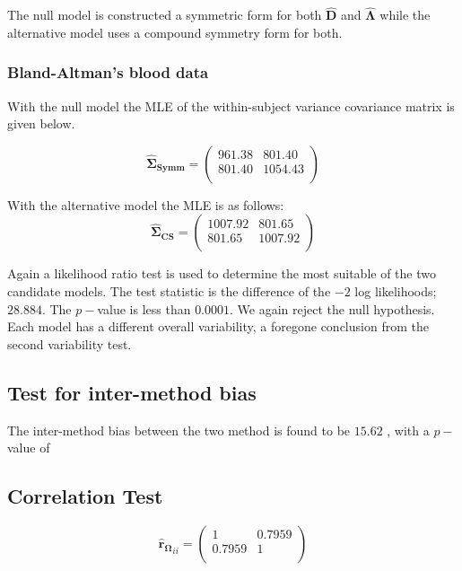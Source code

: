 \documentclass[12pt, a4paper]{report}
\theoremstyle{plain}
\theoremstyle{definition}
\theoremstyle{remark}
\begin{document}
	The null model is constructed a symmetric form for both $\boldsymbol{\hat{D}}$ and $\boldsymbol{\hat{\Lambda}}$ while the alternative model uses a compound symmetry form for both.
	
	\subsubsection{Bland-Altman's blood data}
	With the null model the MLE of the within-subject variance covariance matrix is given below.
	
	\begin{equation}
	\boldsymbol{\hat{\Sigma}_{Symm}} = \left( \begin{array}{cc}
	961.38 & 801.40  \\
	801.40 & 1054.43  \\
	\end{array}\right)
	\end{equation}
	
	With the alternative model the MLE is as follows:
	\begin{equation}
	\boldsymbol{\hat{\Sigma}_{CS}} = \left( \begin{array}{cc}
	1007.92  & 801.65  \\
	801.65  & 1007.92  \\
	\end{array}\right)
	\end{equation}
	
	Again a likelihood ratio test is used to determine the most suitable of the two candidate models.
	The test statistic is the difference of the $-2$ log likelihoods; $28.884$. The $p-$value is less than $0.0001$. We again reject the null hypothesis. Each model has a different overall variability, a foregone conclusion from the second variability test.
	
	
	
	\subsection{Test for inter-method bias}
	The inter-method bias between the two method is found to be $15.62$ , with a $p-$value of
	
	\subsection{Correlation Test}
	\begin{equation}
	\boldsymbol{\hat{r}_{\Omega}}_{ii} = \left( \begin{array}{cc}
	1  & 0.7959  \\
	0.7959  & 1  \\
	\end{array}\right)
	\end{equation}
	
\end{document}
